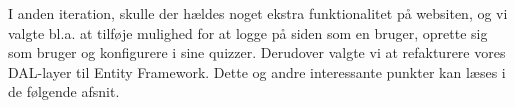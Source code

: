 I anden iteration, skulle der hældes noget ekstra funktionalitet på websiten, og vi valgte bl.a. at tilføje mulighed for at logge på siden som en bruger, oprette sig som bruger og konfigurere i sine quizzer. Derudover valgte vi at refakturere vores DAL-layer til Entity Framework. Dette og andre interessante punkter kan læses i de følgende afsnit.















